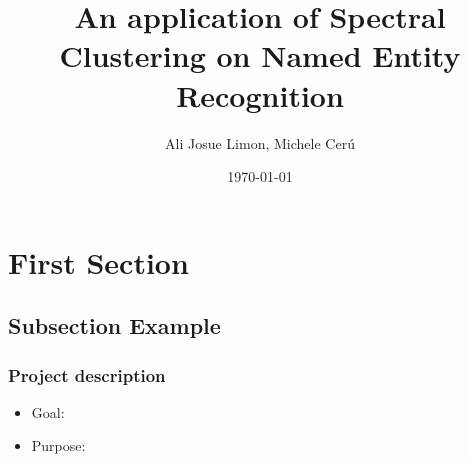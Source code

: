 \documentclass{beamer}
\title[spectral clustering for NER ]{An application of Spectral Clustering on Named Entity Recognition } %
\author{Ali Josue Limon, Michele Cer\'u} %
\institute[UCLA] %
{
New York University \\ %
\medskip
\textit{ajl649@nyu.edu; mc3784@nyu.edu} %
}
\date{\today} %
\begin{document}
\begin{frame}
\titlepage %
\end{frame}





\section{First Section} %

\subsection{Subsection Example} %

\begin{frame}
\frametitle{Project description}
\begin{itemize} 
\item Goal: 
\item Purpose:  
\end{itemize}
 \end{frame}
 
\end{document}
